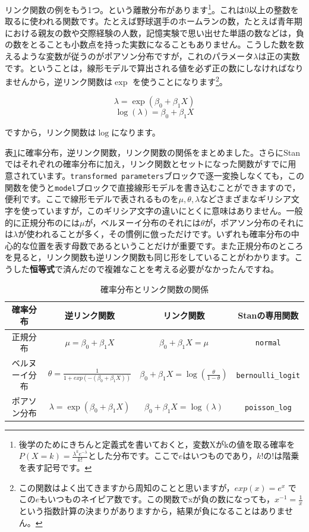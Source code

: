 \documentclass{ltjsbook}
\begin{document}
リンク関数の例をもう1つ。という離散分布があります\footnote{後学のためにきちんと定義式を書いておくと，変数Xがkの値を取る確率を$P(X=k)=\frac{\lambda^k e^{-\lambda}}{k!}$とした分布です。ここで$e$はいつものであり，$k!$の$!$は階乗を表す記号です。}。これは0以上の整数を取るに使われる関数です。たとえば野球選手のホームランの数，たとえば青年期における親友の数や交際経験の人数，記憶実験で思い出せた単語の数などは，負の数をとることも小数点を持った実数になることもありません。こうした数を数えるような変数が従うのがポアソン分布ですが，これのパラメータ$\lambda$は正の実数です。ということは，線形モデルで算出される値を必ず正の数にしなければなりませんから，逆リンク関数は$\exp$ を使うことになります\footnote{この関数はよく出てきますから周知のことと思いますが，$exp(x)=e^x$ でこの$e$もいつものネイピア数です。この関数でxが負の数になっても，$x^{-1}=\frac{1}{x}$という指数計算の決まりがありますから，結果が負になることはありません。}。

\[ \lambda = \exp(\beta_0 + \beta_1 X) \]
\[ \log(\lambda) = \beta_0 + \beta_1X \]

ですから，リンク関数は$\log$になります。

表\ref{tbl:12_01}に確率分布，逆リンク関数，リンク関数の関係をまとめました。さらにStanではそれぞれの確率分布に加え，リンク関数とセットになった関数がすでに用意されています。\verb|transformed parameters|ブロックで逐一変換しなくても，この関数を使うと\verb|model|ブロックで直接線形モデルを書き込むことができますので，便利です。ここで線形モデルで表されるものを$\mu,\theta,\lambda$などさまざまなギリシア文字を使っていますが，このギリシア文字の違いにとくに意味はありません。一般的に正規分布のには$\mu$が，ベルヌーイ分布のそれには$\theta$が，ポアソン分布のそれには$\lambda$が使われることが多く，その慣例に倣っただけです。いずれも確率分布の中心的な位置を表す母数であるということだけが重要です。また正規分布のところを見ると，リンク関数も逆リンク関数も同じ形をしていることがわかります。こうした\textbf{恒等式}で済んだので複雑なことを考える必要がなかったんですね。

\begin{table}[ht]
	\centering
	\caption{確率分布とリンク関数の関係}
	\begin{tabular}{cccc}
		確率分布    & 逆リンク関数                                          & リンク関数                                                             & Stanの専用関数              \\\hline
		正規分布    & $\mu = \beta_0 + \beta_1 X$                     & $\beta_0 + \beta_1X=\mu$                                          & \verb|normal|          \\
		ベルヌーイ分布 & $\theta = \frac{1}{1+exp(-(\beta_0+\beta_1X))}$ & $\beta_0 + \beta_1 X = \log\left(\frac{\theta}{1-\theta}\right) $ & \verb|bernoulli_logit| \\
		ポアソン分布  & $\lambda = \exp(\beta_0 + \beta_1 X)$           & $\beta_0 + \beta_1X = \log(\lambda)$                              & \verb|poisson_log|     \\\hline
	\end{tabular}
	\label{tbl:12_01}
\end{table}
\end{document}
